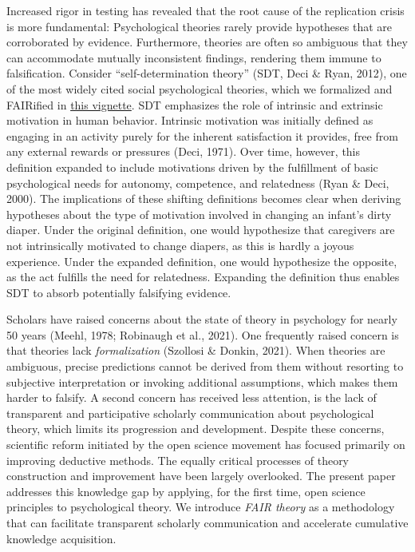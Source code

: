 \documentclass[man]{apa7}
\begin{document}
Increased rigor in testing has revealed that the root cause of the replication crisis is more fundamental:
Psychological theories rarely provide hypotheses that are corroborated by evidence.
Furthermore, theories are often so ambiguous that they can accommodate mutually inconsistent findings,
rendering them immune to falsification.
Consider ``self-determination theory'' (SDT, Deci \& Ryan, 2012), one of the most widely cited social psychological theories, which we formalized and FAIRified in \href{https://cjvanlissa.github.io/theorytools/articles/formalizing_sdt.html}{this vignette}.
SDT emphasizes the role of intrinsic and extrinsic motivation in human behavior.
Intrinsic motivation was initially defined as engaging in an activity purely for the inherent satisfaction it provides, free from any external rewards or pressures (Deci, 1971).
Over time, however, this definition expanded to include motivations driven by the fulfillment of basic psychological needs for autonomy, competence, and relatedness (Ryan \& Deci, 2000).
The implications of these shifting definitions becomes clear when deriving hypotheses about the type of motivation involved in changing an infant's dirty diaper.
Under the original definition, one would hypothesize that caregivers are not intrinsically motivated to change diapers, as this is hardly a joyous experience.
Under the expanded definition, one would hypothesize the opposite, as the act fulfills the need for relatedness.
Expanding the definition thus enables SDT to absorb potentially falsifying evidence.

Scholars have raised concerns about the state of theory in psychology for nearly 50 years (Meehl, 1978; Robinaugh et al., 2021).
One frequently raised concern is that theories lack \emph{formalization} (Szollosi \& Donkin, 2021).
When theories are ambiguous,
precise predictions cannot be derived from them without
resorting to subjective interpretation or invoking additional assumptions,
which makes them harder to falsify.
A second concern has received less attention,
is the lack of transparent and participative scholarly communication about psychological theory, which limits its progression and development.
Despite these concerns, scientific reform initiated by the open science movement has focused primarily on improving deductive methods.
The equally critical processes of theory construction and improvement have been largely overlooked.
The present paper addresses this knowledge gap by applying, for the first time,
open science principles to psychological theory.
We introduce \emph{FAIR theory} as a methodology that can facilitate transparent scholarly communication and accelerate cumulative knowledge acquisition.
\end{document}
